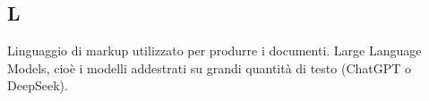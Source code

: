 \begin{center}
\section*{L}
\end{center}
Linguaggio di markup utilizzato per produrre i documenti.
Large Language Models, cioè i modelli addestrati su grandi quantità di testo (ChatGPT o DeepSeek).
